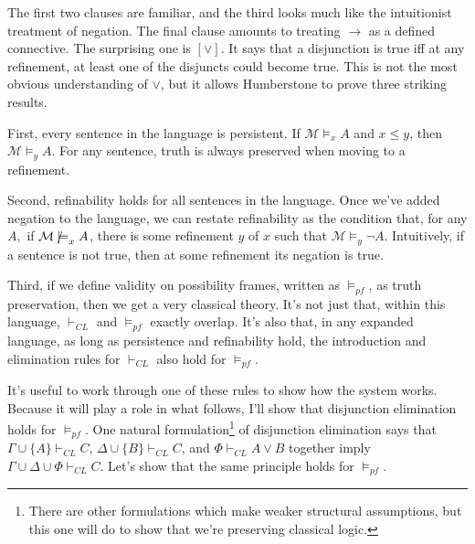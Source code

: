\documentclass[
  11pt,
  letterpaper,
  DIV=11,
  numbers=noendperiod,
  twoside]{scrartcl}
\newcommand{\nmodels}{\mathrel{\ooalign{$\models$\cr\raisebox{-0.001ex}{\hss$\mkern-1mu/\hss$}}}}
\begin{document}
The first two clauses are familiar, and the third looks much like the
intuitionist treatment of negation. The final clause amounts to treating
\(\rightarrow\) as a defined connective. The surprising one is
\([\vee]\). It says that a disjunction is true iff at any refinement, at
least one of the disjuncts could become true. This is not the most
obvious understanding of \(\vee\), but it allows Humberstone to prove
three striking results.

First, every sentence in the language is persistent. If
\(\mathcal{M} \models_x A\) and \(x \leqslant y\), then
\(\mathcal{M} \models_y A\). For any sentence, truth is always preserved
when moving to a refinement.

Second, refinability holds for all sentences in the language. Once we've
added negation to the language, we can restate refinability as the
condition that, for any \(A,\) if \(\mathcal{M} \nmodels_x A\), there is
some refinement \(y\) of \(x\) such that
\(\mathcal{M} \models_y \neg A\). Intuitively, if a sentence is not
true, then at some refinement its negation is true.

Third, if we define validity on possibility frames, written as
\(\vDash_{pf}\), as truth preservation, then we get a very classical
theory. It's not just that, within this language, \(\vdash_{CL}\) and
\(\vDash_{pf}\) exactly overlap. It's also that, in any expanded
language, as long as persistence and refinability hold, the introduction
and elimination rules for \(\vdash_{CL}\) also hold for \(\vDash_{pf}\).

It's useful to work through one of these rules to show how the system
works. Because it will play a role in what follows, I'll show that
disjunction elimination holds for \(\vDash_{pf}\). One natural
formulation\footnote{There are other formulations which make weaker
  structural assumptions, but this one will do to show that we're
  preserving classical logic.} of disjunction elimination says that
\(\Gamma \cup \{A\} \vdash_{CL} C\),
\(\Delta \cup \{B\} \vdash_{CL} C\), and \(\Phi \vdash_{CL} A \vee B\)
together imply \(\Gamma \cup \Delta \cup \Phi \vdash_{CL} C\). Let's
show that the same principle holds for \(\vDash_{pf}\).
\end{document}
